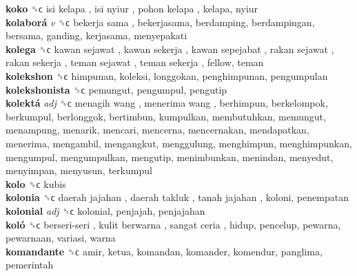 \textbf{koko} ␝ϲ   isi kelapa ,  isi nyiur ,  pohon kelapa , kelapa, nyiur  \\
\textbf{kolaborá} \emph{v}  ␝ϲ   bekerja sama , bekerjasama, berdamping, berdampingan, bersama, ganding, kerjasama, menyepakati  \\
\textbf{kolega} ␝ϲ   kawan sejawat ,  kawan sekerja ,  kawan sepejabat ,  rakan sejawat ,  rakan sekerja ,  teman sejawat ,  teman sekerja , fellow, teman  \\
\textbf{kolekshon} ␝ϲ  himpunan, koleksi, longgokan, penghimpunan, pengumpulan  \\
\textbf{kolekshonista} ␝ϲ  pemungut, pengumpul, pengutip  \\
\textbf{kolektá} \emph{adj}  ␝ϲ   menagih wang ,  menerima wang , berhimpun, berkelompok, berkumpul, berlonggok, bertimbun, kumpulkan, membutuhkan, memungut, menampung, menarik, mencari, mencerna, mencernakan, mendapatkan, menerima, mengambil, mengangkut, menggulung, menghimpun, menghimpunkan, mengumpul, mengumpulkan, mengutip, menimbunkan, menindan, menyedut, menyimpan, menyusun, terkumpul  \\
\textbf{kolo} ␝ϲ  kubis  \\
\textbf{kolonia} ␝ϲ   daerah jajahan ,  daerah takluk ,  tanah jajahan , koloni, penempatan  \\
\textbf{kolonial} \emph{adj}  ␝ϲ  kolonial, penjajah, penjajahan  \\
\textbf{koló} ␝ϲ   berseri-seri ,  kulit berwarna ,  sangat ceria , hidup, pencelup, pewarna, pewarnaan, variasi, warna  \\
\textbf{komandante} ␝ϲ  amir, ketua, komandan, komander, komendur, panglima, pemerintah  \\
